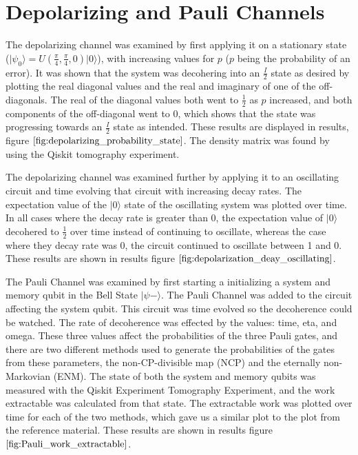 \documentclass[12pt]{article}
\begin{document}
  \section{Depolarizing and Pauli Channels}
  The depolarizing channel was examined by first applying it on a stationary state ($\vert\psi_0\rangle = U(\frac{\pi}{4}, \frac{\pi}{4},0)\vert 0\rangle$), with increasing values for $p$ ($p$ being the probability of an error). It was shown that the system was decohering into an $\frac{I}{2}$ state as desired by plotting the real diagonal values and the real and imaginary of one of the off-diagonals. The real of the diagonal values both went to $\frac{1}{2}$ as $p$ increased, and both components of the off-diagonal went to 0, which shows that the state was progressing towards an $\frac{I}{2}$ state as intended. These results are displayed in results, figure $\ref{fig:depolarizing_probability_state}$. The density matrix was found by using the Qiskit tomography experiment. 

The depolarizing channel was examined further by applying it to an oscillating circuit and time evolving that circuit with increasing decay rates. The expectation value of the $\vert 0 \rangle$ state of the oscillating system was plotted over time. In all cases where the decay rate is greater than 0, the expectation value of $\vert 0 \rangle$ decohered to $\frac{1}{2}$ over time instead of continuing to oscillate, whereas the case where they decay rate was 0, the circuit continued to oscillate between 1 and 0. These results are shown in results figure $\ref{fig:depolarization_deay_oscillating}$.

The Pauli Channel was examined by first starting a initializing a system and memory qubit in the Bell State $\vert \psi - \rangle$. The Pauli Channel was added to the circuit affecting the system qubit. This circuit was time evolved so the decoherence could be watched. The rate of decoherence was effected by the values: time, eta, and omega. These three values affect the probabilities of the three Pauli gates, and there are two different methods used to generate the probabilities of the gates from these parameters, the non-CP-divisible map (NCP) and the eternally non-Markovian (ENM). The state of both the system and memory qubits was measured with the Qiskit Experiment Tomography Experiment, and the work extractable was calculated from that state. The extractable work was plotted over time for each of the two methods, which gave us a similar plot to the plot from the reference material. These results are shown in results figure $\ref{fig:Pauli_work_extractable}$.
\end{document}

